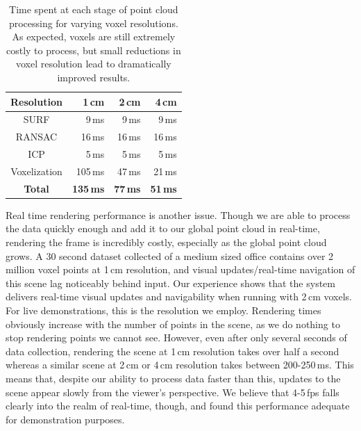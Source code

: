 \documentclass[letterpaper, 10pt, conference]{ieeeconf}
\begin{document}
\begin{table}
    \centering
    \begin{tabular}{ | c || r | r | r | }
    \hline
    Resolution & 1\,cm  & 2\,cm & 4\,cm \\
    \hline
    \hline
    SURF & 9\,ms &9\,ms & 9\,ms \\
    \hline
    RANSAC & 16\,ms & 16\,ms & 16\,ms\\
    \hline
    ICP & 5\,ms & 5\,ms & 5\,ms \\
    \hline
    Voxelization & 105\,ms & 47\,ms & 21\,ms \\
    \hline
    {\bf Total} & {\bf 135\,ms} & {\bf 77\,ms} & {\bf 51\,ms} \\
    \hline
    \end{tabular}
\caption{Time spent at each stage of point cloud processing for varying voxel
    resolutions. As expected, voxels are still extremely costly to process,
    but small reductions in voxel resolution lead to dramatically improved
    results.}
\label{tbl:match-times}
\end{table}


Real time rendering performance is another issue. Though we are able to
process the data quickly enough and add it to our global point cloud in
real-time, rendering the frame is incredibly costly, especially as the global
point cloud grows. A 30 second dataset collected of a medium sized office
contains over 2 million voxel points at 1\,cm resolution, and visual
updates/real-time navigation of this scene lag noticeably behind input. Our
experience shows that the system delivers real-time visual updates and
navigability when running with 2\,cm voxels. For live demonstrations, this is
the resolution we employ. Rendering times obviously increase with the number
of points in the scene, as we do nothing to stop rendering points we cannot
see. However, even after only several seconds of data collection, rendering
the scene at 1\,cm resolution takes over half a second whereas a similar scene
at 2\,cm or 4\,cm resolution takes between 200-250\,ms. This means that,
despite our ability to process data faster than this, updates to the scene
appear slowly from the viewer's perspective. We believe that 4-5\,fps falls
clearly into the realm of real-time, though, and found this performance
adequate for demonstration purposes.
\end{document}
